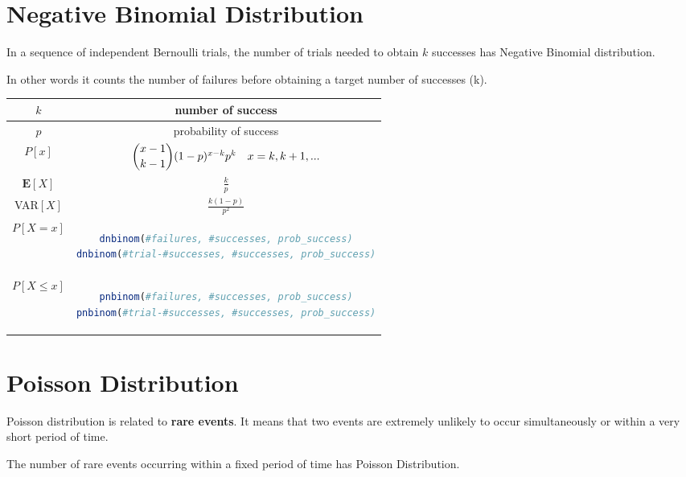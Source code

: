 \newpage
\section{Negative Binomial Distribution}
\begin{tcolorbox}
In a sequence of independent Bernoulli trials, the number of trials needed to obtain \(k\) successes has Negative Binomial distribution. 

In other words it counts the number of failures before obtaining a target number of successes (k).
\end{tcolorbox}
\begingroup
\setlength{\tabcolsep}{10pt} %
\renewcommand{\arraystretch}{1.5} %
\begin{center}
\begin{tabular}{ |c|c| } 
\hline
\(k\) & number of success \\ \hline
\(p\) & probability of success \\ \hline
\(P[x]\) & $\dbinom{x - 1}{k - 1}(1 - p)^{x - k}p^k \quad x = k, k+1,...$\\ \hline
\(\mathbf{E}[X]\) & \(\frac{k}{p}\) \\ \hline
VAR\([X]\) & \(\frac{k(1 - p)}{p^2}\) \\ \hline\hline
\(P[X = x]\) & \begin{lstlisting}[language=R]
dnbinom(#failures, #successes, prob_success)
dnbinom(#trial-#successes, #successes, prob_success)
\end{lstlisting} \\ \hline
\(P[X \leq x]\) & \begin{lstlisting}[language=R]
pnbinom(#failures, #successes, prob_success)
pnbinom(#trial-#successes, #successes, prob_success)
\end{lstlisting} \\ \hline
\end{tabular}
\end{center}
\endgroup


\section{Poisson Distribution}
\begin{tcolorbox}
    Poisson distribution is related to \textbf{rare events}. It means that two events are extremely unlikely to occur simultaneously or within a very short period of time.

    The number of rare events occurring within a fixed period of time has Poisson Distribution.
\end{tcolorbox}

